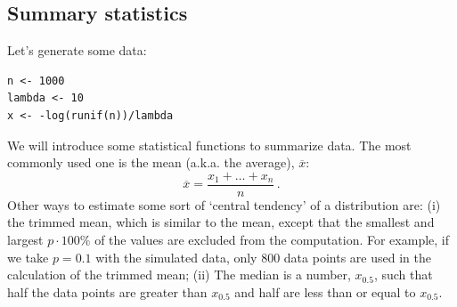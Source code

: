\documentclass[11pt]{article}
\theoremstyle{definition}
\begin{document}
\subsection{Summary statistics}
Let's generate some data:
\begin{verbatim}
n <- 1000
lambda <- 10
x <- -log(runif(n))/lambda
\end{verbatim}
We will introduce some statistical functions to summarize data. The most commonly used one is the mean (a.k.a. the average), $\overline{x}$:
$$\overline{x}=\frac{x_1+\ldots+x_n}{n}\,.$$
Other ways to estimate some sort of `central tendency' of a distribution are:
 (i) the trimmed mean, which is similar to the mean, except that the smallest and largest $p\cdot 100\%$  of the values are excluded from the computation. For example, if we take $p=0.1$ with the simulated data, only 800 data points are used in the calculation of the trimmed mean; (ii) The median is a number, $x_{0.5}$, such that half the data points are greater than $x_{0.5}$ and half are less than or equal to $x_{0.5}$.


\end{document}

